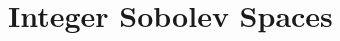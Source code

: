 \documentclass[../main.tex]{subfiles}
\begin{document}
\section{Integer Sobolev Spaces}
\end{document}
